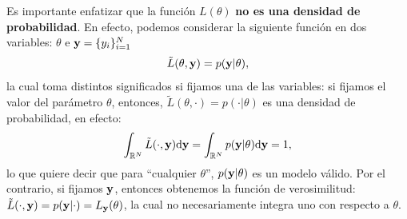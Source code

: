 Es importante enfatizar que la función $L(\theta)$ \textbf{no es una densidad de probabilidad}. En efecto, podemos considerar la siguiente función en dos variables: $\theta$ e $\mathbf{y}=\{y_i\}_{i=1}^N$   
\begin{equation}
	\tilde{L}(\theta,\mathbf{y}) = p(\mathbf{y}|\theta),
\end{equation}
la cual toma distintos significados si  fijamos una de las variables: si fijamos el valor del parámetro $\theta$, entonces, $\tilde{L}(\theta,\cdot) = p(\cdot|\theta)$ es una densidad de probabilidad, en efecto: 
\begin{equation}
	\int_{\mathbb{R}^N}\tilde{L}(\cdot,\mathbf{y}){\text d}\mathbf{y} = \int_{\mathbb{R}^N}p(\mathbf{y}|\theta){\text d}\mathbf{y} = 1,
\end{equation}
lo que quiere decir que para ``cualquier $\theta$'', $p(\mathbf{y}|\theta)$ es un modelo válido. Por el contrario, si fijamos $\mathbf{y}$, entonces obtenemos la función de verosimilitud: $\tilde{L}(\cdot,\mathbf{y}) = p(\mathbf{y}|\cdot) = L_{\mathbf{y}}(\theta)$, la  cual no necesariamente integra uno con respecto a $\theta$.

